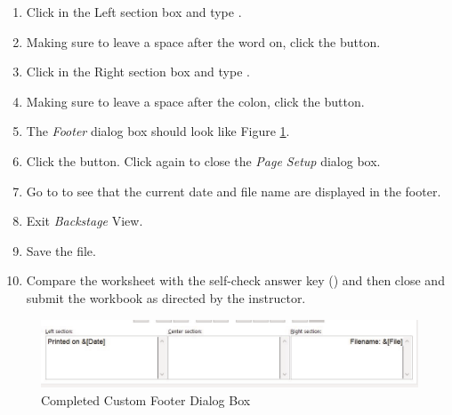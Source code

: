 \begin{enumbox}
	\begin{enumerate}
		\item Click in the Left section box and type .
		\item Making sure to leave a space after the word on, click the  button.
		\item Click in the Right section box and type .
		\item Making sure to leave a space after the colon, click the  button.
		\item The \textit{Footer} dialog box should look like Figure \ref{02:fig46}.
		\item Click the  button. Click  again to close the \textit{Page Setup} dialog box.
		\item Go to  to see that the current date and file name are displayed in the footer.
		\item Exit \textit{Backstage} View.
		\item Save the  file.
		\item Compare the worksheet with the self-check answer key () and then close and submit the  workbook as directed by the instructor.	
	\end{enumerate}
\end{enumbox}

\begin{figure}[H]
	\centering
	\includegraphics[width=\maxwidth{.95\linewidth}]{gfx/ch02_fig46}
	\caption{Completed Custom Footer Dialog Box}
	\label{02:fig46}
\end{figure}

